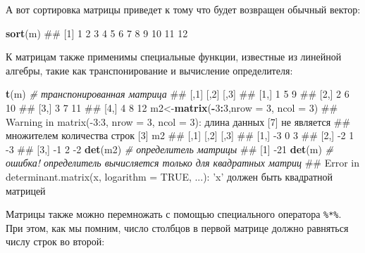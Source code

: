 \documentclass[]{book}
\newenvironment{Shaded}{\begin{snugshade}}{\end{snugshade}}
\newcommand{\KeywordTok}[1]{\textcolor[rgb]{0.13,0.29,0.53}{\textbf{#1}}}
\newcommand{\DataTypeTok}[1]{\textcolor[rgb]{0.13,0.29,0.53}{#1}}
\newcommand{\DecValTok}[1]{\textcolor[rgb]{0.00,0.00,0.81}{#1}}
\newcommand{\StringTok}[1]{\textcolor[rgb]{0.31,0.60,0.02}{#1}}
\newcommand{\CommentTok}[1]{\textcolor[rgb]{0.56,0.35,0.01}{\textit{#1}}}
\newcommand{\OperatorTok}[1]{\textcolor[rgb]{0.81,0.36,0.00}{\textbf{#1}}}
\newcommand{\NormalTok}[1]{#1}
\begin{document}
А вот сортировка матрицы приведет к тому что будет возвращен обычный
вектор:

\begin{Shaded}
\begin{Highlighting}[]
\KeywordTok{sort}\NormalTok{(m)}
\NormalTok{##  [1]  1  2  3  4  5  6  7  8  9 10 11 12}
\end{Highlighting}
\end{Shaded}

К матрицам также применимы специальные функции, известные из линейной
алгебры, такие как транспонирование и вычисление определителя:

\begin{Shaded}
\begin{Highlighting}[]
\KeywordTok{t}\NormalTok{(m)  }\CommentTok{# транспонированная матрица}
\NormalTok{##      [,1] [,2] [,3]}
\NormalTok{## [1,]    1    5    9}
\NormalTok{## [2,]    2    6   10}
\NormalTok{## [3,]    3    7   11}
\NormalTok{## [4,]    4    8   12}
\NormalTok{m2<-}\KeywordTok{matrix}\NormalTok{(}\OperatorTok{-}\DecValTok{3}\OperatorTok{:}\DecValTok{3}\NormalTok{,}\DataTypeTok{nrow =} \DecValTok{3}\NormalTok{, }\DataTypeTok{ncol =} \DecValTok{3}\NormalTok{)}
\NormalTok{## Warning in matrix(-3:3, nrow = 3, ncol = 3): длина данных [7] не является}
\NormalTok{## множителем количества строк [3]}
\NormalTok{m2}
\NormalTok{##      [,1] [,2] [,3]}
\NormalTok{## [1,]   -3    0    3}
\NormalTok{## [2,]   -2    1   -3}
\NormalTok{## [3,]   -1    2   -2}
\KeywordTok{det}\NormalTok{(m2) }\CommentTok{# определитель матрицы}
\NormalTok{## [1] -21}
\KeywordTok{det}\NormalTok{(m)  }\CommentTok{# ошибка! определитель вычисляется только для квадратных матриц}
\NormalTok{## Error in determinant.matrix(x, logarithm = TRUE, ...): 'x' должен быть квадратной матрицей}
\end{Highlighting}
\end{Shaded}

Матрицы также можно перемножать с помощью специального оператора
\texttt{\%*\%}. При этом, как мы помним, число столбцов в первой матрице
должно равняться числу строк во второй:

\begin{Shaded}
\end{Shaded}
\end{document}

